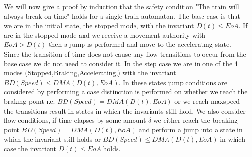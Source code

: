 We will now give a proof by induction that the safety condition "The train will always break on time" holds for a single train automaton.
The base case is that we are in the initial state, the stopped mode, with the invariant $D(t) \leq EoA$. If are in the stopped mode and we receive a movement authority with $EoA > D(t)$ then a jump is performed and move to the accelerating state. Since the transition of time does not cause any flow transitions to occur from the base case we do not need to consider it. In the step case we are in one of the 4 modes (Stopped,Braking,Accelerating,) with the invariant $BD(Speed) \leq DMA(D(t), EoA)$. In these states jump conditions are considered by performing a case distinction is performed on whether we reach the braking point i.e. $BD(Speed) = DMA(D(t), EoA)$ or we reach maxspeed the transitions result in states in which the invariants still hold. We also consider flow conditions, if time elapses by some amount $\delta$ we either reach the breaking point $BD(Speed) = DMA(D(t), EoA)$ and perform a jump into a state in which the invariant still holds or $BD(Speed) \leq DMA(D(t), EoA)$ in which case the invariant $D(t) \leq EoA$ holds. 

